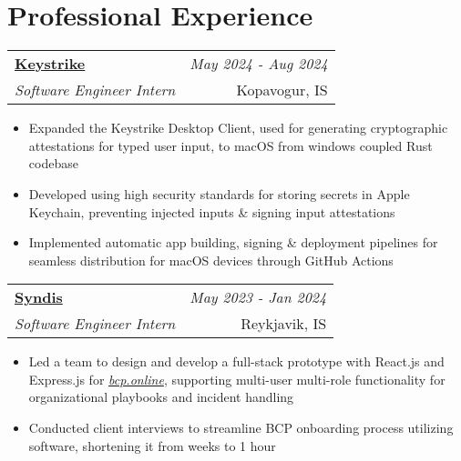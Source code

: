 \documentclass{article}
\makeatletter
\newcommand{\resumeSubheading}[4]{
\vspace{3mm}
    \begin{tabular*}{0.99\textwidth}[t]{l@{\extracolsep{\fill}}r}
		\textbf{\normalsize{#1}} & \textit{\normalsize{#4}} \\
        \textit{\normalsize{#3}} &  \normalsize{#2}\\
    \end{tabular*}
    \vspace{-2mm}
}
\newcommand{\resumeSubHeadingListStart}{}
\newcommand{\resumeItemListStart}{\begin{itemize}[leftmargin=*,labelsep=1mm,itemsep=-1mm]\normalsize}
\newcommand{\resumeItemListEnd}{\end{itemize}\vspace{-\baselineskip}}
\makeatother
\begin{document}
\section{\textbf{Professional Experience}}
  \resumeSubHeadingListStart


  \resumeSubheading
      {\href{https://keystrike.com}{Keystrike}}{Kopavogur, IS}
	  {Software Engineer Intern}{May 2024 - Aug 2024}
      \resumeItemListStart
	    \item Expanded the Keystrike Desktop Client, used for generating cryptographic attestations for typed user input, to macOS from windows coupled Rust codebase



		\item Developed using high security standards for storing secrets in Apple Keychain, preventing injected inputs \& signing input attestations

		\item Implemented automatic app building, signing \& deployment pipelines for seamless distribution for macOS devices through GitHub Actions 
      \resumeItemListEnd 

  \resumeSubheading
    {\href{https://www.syndis.is}{Syndis}}{Reykjavik, IS}
    {Software Engineer Intern}{May 2023 - Jan 2024}
    \resumeItemListStart
	  \item Led a team to design and develop a full-stack prototype with React.js and Express.js for \href{https://bcp.online}{\emph{bcp.online}}, supporting multi-user multi-role functionality for organizational playbooks and incident handling

	  \item Conducted client interviews to streamline BCP onboarding process utilizing software, shortening it from weeks to 1 hour
    \resumeItemListEnd
	
\end{document}
